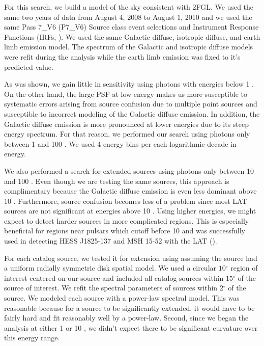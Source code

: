 \documentclass[12pt,preprint]{aastex}
\newcommand{\gev}{\text{GeV}\xspace}
\renewcommand{\deg}{\ensuremath{^\circ}\xspace}
\newcommand{\pointlike}{\text{\em pointlike}\xspace}
\begin{document}
For this search, we build a model of the
sky consistent with 2FGL.   We used the same two
years of data from August 4, 2008 to August 1, 2010 and we used the same
Pass 7\_V6 (P7\_V6) Source class event selections and 
Instrument Response Functions (IRFs, \cite{lat_on_orbit_psf}).  We used the same Galactic diffuse,
isotropic diffuse, and earth limb emission model. The spectrum of the
Galactic and isotropic diffuse models were refit during the analysis
while the earth limb emission was fixed to it's predicted value.

As was shown, we gain little in sensitivity using photons with energies
below 1 \gev. On the other hand, the large PSF at low energy makes us
more susceptible to systematic errors arising from source confusion due
to multiple point sources and susceptible to incorrect modeling of the
Galactic diffuse emission. In addition, the Galactic diffuse emission
is more pronounced at lower energies due to its steep energy spectrum.
For that reason, we performed our search using photons only between 1
\gev and 100 \gev.  We used 4 energy bins per each logarithmic decade
in energy.

We also performed a search for extended sources using photons only between
10 \gev and 100 \gev. Even though we are testing the same sources, this
approach is complimentary because the Galactic diffuse emission is even
less dominant above 10 \gev. Furthermore, source confusion becomes less of
a problem since most LAT sources are not significant at energies above 10
\gev.  Using higher energies, we might expect to detect harder sources in
more complicated regions. This is especially beneficial
for regions near pulsars which cutoff before 10 \gev
and was successfully used in detecting HESS J1825-137
and MSH 15-52 with the LAT (\cite{msh1552,fermi_hess_j1825}).

For each catalog source, we tested it for extension using \pointlike
assuming the source had a uniform radially symmetric disk spatial model.
We used a circular $10\deg$ region of interest centered on our source and
included all catalog sources within $15\deg$ of the source of interest.
We refit the spectral parameters of sources within $2\deg$ of the source.
We modeled each source with a power-law spectral model. This was reasonable because for a source to be significantly
extended, it would have to be fairly hard and fit reasonably well by
a power-law. Second, since we began the analysis at either 1 \gev or
10 \gev, we didn't expect there to be significant curvature over this
energy range.
\end{document}
